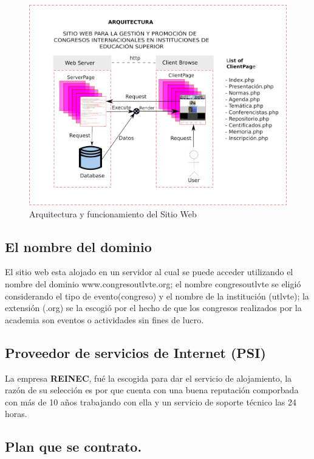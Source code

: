 \documentclass[a4paper,14px]{article}
\begin{document}
\begin{figure}[H]
  \centering
  \includegraphics[scale=0.25]{congresoweb.jpg}
  \caption{Arquitectura y funcionamiento del Sitio Web}
  \label{fig:arquitectura}
\end{figure}


\subsection{El nombre del dominio}
\label{sec:nombres-del-dominio}

El sitio web esta alojado en un servidor al cual se puede acceder utilizando el nombre del dominio www.congresoutlvte.org; el nombre congresoutlvte se eligió considerando el tipo de evento(congreso) y el nombre de la institución (utlvte); la extensión (.org) se la escogió por el hecho de que los congresos realizados por la academia son eventos o actividades sin fines de lucro.


\subsection{Proveedor de servicios de Internet (PSI)}
\label{sec:prov-de-serv}

La empresa \textbf{REINEC}, fué la escogida para dar el servicio de alojamiento, la razón de su selección es por que cuenta con una buena reputación comporbada con más de 10 años trabajando con ella  y un servicio de soporte  técnico las 24 horas.

\subsection{Plan que se contrato.}
\label{sec:plan-que-se}
\end{document}
